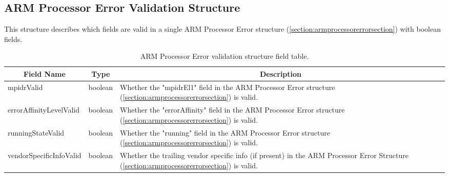 \documentclass{report}
\newcommand*{\thead}[1]{\multicolumn{1}{|c|}{\bfseries #1}}
\newcommand*{\jsontable}[1]{
    \begin{table}[!ht]
    \label{#1}
    \centering
    \begin{adjustbox}{center}
    \begin{tabular}{|l|c|p{8cm}|}
    \hline
    \thead{Field Name} & \thead{Type} & \thead{Description} \\
    \hline
}
\newcommand*{\jsontableend}[1]{
    \hline
    \end{tabular}
    \end{adjustbox}
    \caption{#1}
    \label{table:#1}
    \end{table}
    \FloatBarrier
}
\begin{document}
\subsection{ARM Processor Error Validation Structure}
\label{subsection:armprocessorerrorvalidationstructure}
This structure describes which fields are valid in a single ARM Processor Error structure (\ref{section:armprocessorerrorsection}) with boolean fields.
\jsontable{table:armprocessorerrorvalidationstructure}
mpidrValid & boolean & Whether the "mpidrEl1" field in the ARM Processor Error structure (\ref{section:armprocessorerrorsection}) is valid.\\
\hline
errorAffinityLevelValid & boolean & Whether the "errorAffinity" field in the ARM Processor Error structure (\ref{section:armprocessorerrorsection}) is valid.\\
\hline
runningStateValid & boolean & Whether the "running" field in the ARM Processor Error structure (\ref{section:armprocessorerrorsection}) is valid.\\
\hline
vendorSpecificInfoValid & boolean & Whether the trailing vendor specific info (if present) in the ARM Processor Error Structure (\ref{section:armprocessorerrorsection}) is valid.\\
\jsontableend{ARM Processor Error validation structure field table.}

\end{document}
